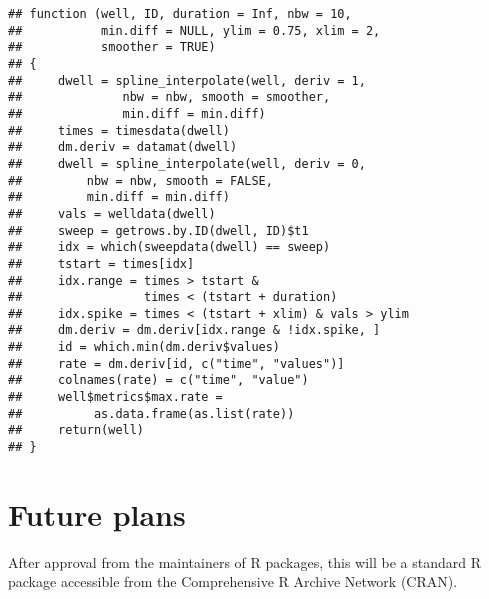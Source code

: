 \begin{knitrout}
\color{fgcolor}\begin{kframe}
\begin{alltt}
\end{alltt}
\begin{verbatim}
## function (well, ID, duration = Inf, nbw = 10, 
##           min.diff = NULL, ylim = 0.75, xlim = 2,
##           smoother = TRUE) 
## {
##     dwell = spline_interpolate(well, deriv = 1, 
##              nbw = nbw, smooth = smoother, 
##              min.diff = min.diff)
##     times = timesdata(dwell)
##     dm.deriv = datamat(dwell)
##     dwell = spline_interpolate(well, deriv = 0, 
##         nbw = nbw, smooth = FALSE, 
##         min.diff = min.diff)
##     vals = welldata(dwell)
##     sweep = getrows.by.ID(dwell, ID)$t1
##     idx = which(sweepdata(dwell) == sweep)
##     tstart = times[idx]
##     idx.range = times > tstart & 
##                 times < (tstart + duration)
##     idx.spike = times < (tstart + xlim) & vals > ylim
##     dm.deriv = dm.deriv[idx.range & !idx.spike, ]
##     id = which.min(dm.deriv$values)
##     rate = dm.deriv[id, c("time", "values")]
##     colnames(rate) = c("time", "value")
##     well$metrics$max.rate = 
##          as.data.frame(as.list(rate))
##     return(well)
## }
\end{verbatim}
\end{kframe}
\end{knitrout}

\section{Future plans}
After approval from the maintainers of R packages, this will be
a standard R package accessible from the Comprehensive R Archive Network (CRAN).





